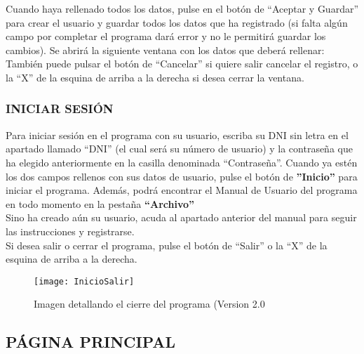 Cuando haya rellenado todos los datos, pulse en el botón de “Aceptar y Guardar” para crear el usuario y guardar todos los datos que ha registrado (si falta algún campo por completar el programa dará error y no le permitirá guardar los cambios).
Se abrirá la siguiente ventana con los datos que deberá rellenar:
También puede pulsar el botón de “Cancelar” si quiere salir cancelar el registro, o la “X” de la esquina de arriba a la derecha si desea cerrar la ventana.
\pagebreak

\subsubsection{INICIAR SESIÓN}
Para iniciar sesión en el programa con su usuario, escriba su DNI sin letra en el apartado llamado “DNI” (el cual será su número de usuario) y la contraseña que ha elegido anteriormente en la casilla denominada “Contraseña”. Cuando ya estén los dos campos rellenos con sus datos de usuario, pulse el botón de \textbf{''Inicio''} para iniciar el programa. Además, podrá encontrar el Manual de Usuario del programa en todo momento en la pestaña \textbf{``Archivo''}\\
Sino ha creado aún su usuario, acuda al apartado anterior del manual para seguir las instrucciones y registrarse.\\
Si desea salir o cerrar el programa, pulse el botón de “Salir” o la “X” de la esquina de arriba a la derecha.
\begin{figure}[htb]
\centering
\texttt{[image: InicioSalir]} 
\caption{Imagen detallando el cierre del programa (Version 2.0}
\end{figure}
\pagebreak

\subsection{PÁGINA PRINCIPAL}
\pagebreak


